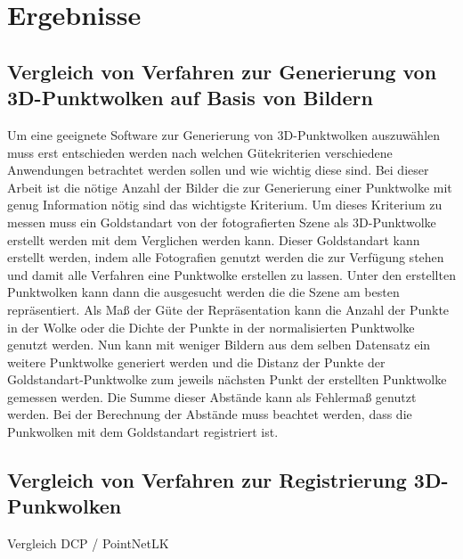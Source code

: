 \documentclass[12pt,titlepage, twoside]{article}
\begin{document}
\newpage
\section{Ergebnisse}
\label{sec:ergebnisse}
%

\subsection{Vergleich von Verfahren zur Generierung von 3D-Punktwolken auf Basis von Bildern}

Um eine geeignete Software zur Generierung von 3D-Punktwolken auszuwählen muss erst entschieden werden nach welchen Gütekriterien verschiedene Anwendungen betrachtet werden sollen und wie wichtig diese sind.
Bei dieser Arbeit ist die nötige Anzahl der Bilder die zur Generierung einer Punktwolke mit genug Information nötig sind das wichtigste Kriterium. 
Um dieses Kriterium zu messen muss ein Goldstandart von der fotografierten Szene als 3D-Punktwolke erstellt werden mit dem Verglichen werden kann.
Dieser Goldstandart kann erstellt werden, indem alle Fotografien genutzt werden die zur Verfügung stehen und damit alle Verfahren eine Punktwolke erstellen zu lassen. 
Unter den erstellten Punktwolken kann dann die ausgesucht werden die die Szene am besten repräsentiert. 
Als Maß der Güte der Repräsentation kann die Anzahl der Punkte in der Wolke oder die Dichte der Punkte in der normalisierten Punktwolke genutzt werden.
Nun kann mit weniger Bildern aus dem selben Datensatz ein weitere Punktwolke generiert werden und die Distanz der Punkte der Goldstandart-Punktwolke zum jeweils nächsten Punkt der erstellten Punktwolke gemessen werden.
Die Summe dieser Abstände kann als Fehlermaß genutzt werden. Bei der Berechnung der Abstände muss beachtet werden, dass die Punkwolken mit dem Goldstandart registriert ist.


\subsection{Vergleich von Verfahren zur Registrierung 3D-Punkwolken}

Vergleich DCP /  PointNetLK
\end{document}
